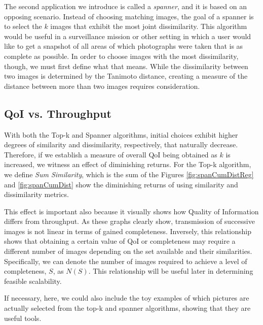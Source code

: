 The second application we introduce is called a \emph{spanner}, and it is based on an opposing scenario.  Instead of  choosing matching images, the goal of a spanner is to select the $k$ images that exhibit the most joint dissimilarity.  This algorithm would be useful in a surveillance mission or other setting in which a user would like to get a snapshot of all areas of which photographs were taken that is as complete as possible.  In order to choose images with the most dissimilarity, though, we must first define what that means.  While the dissimilarity between two images is determined by the Tanimoto distance, creating a measure of the distance between more than two images requires consideration.  

\subsection{QoI vs. Throughput}

With both the Top-k and Spanner algorithms, initial choices exhibit higher degrees of similarity and dissimilarity, respectively, that naturally decrease.  Therefore, if we establish a measure of overall QoI being obtained as $k$ is increased, we witness an effect of diminishing returns.  For the Top-k algorithm, we define \emph{Sum Similarity}, which is the sum of the Figures \ref{fig:spanCumDistReg} and \ref{fig:spanCumDist} show the diminishing returns of using similarity and dissimilarity metrics.

This effect is important also because it visually shows how Quality of Information differs from throughput.  As these graphs clearly show, transmission of successive images is not linear in terms of gained completeness.  Inversely, this relationship shows that obtaining a certain value of QoI or completeness may require a different number of images depending on the set available and their similarities.  Specifically, we can denote the number of images required to achieve a level of completeness, $S$, as $N(S)$.  This relationship will be useful later in determining feasible scalability.


If necessary, here, we could also include the toy examples of which pictures are actually selected from the top-k and spanner algorithms, showing that they are useful tools.





